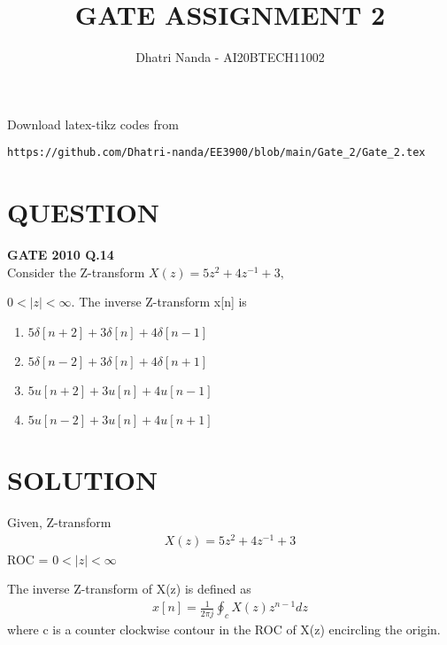 \documentclass[journal,12pt,twocolumn]{IEEEtran}
\begin{document}
\let\vec\mathbf
\renewcommand{\thefigure}{\theproblem}
\def\putbox#1#2#3{\makebox[0in][l]{\makebox[#1][l]{}\raisebox{\baselineskip}[0in][0in]{\raisebox{#2}[0in][0in]{#3}}}}
     \def\rightbox#1{\makebox[0in][r]{#1}}
     \def\centbox#1{\makebox[0in]{#1}}
     \def\topbox#1{\raisebox{-\baselineskip}[0in][0in]{#1}}
     \def\midbox#1{\raisebox{-0.5\baselineskip}[0in][0in]{#1}}
\vspace{3cm}
\title{\textbf{ GATE ASSIGNMENT 2}}
\author{Dhatri Nanda - AI20BTECH11002}
\maketitle
\newpage
\bigskip
\renewcommand{\thefigure}{\arabic{figure}}
\renewcommand{\thetable}{\arabic{table}}
Download latex-tikz codes from 
%
\begin{lstlisting}
https://github.com/Dhatri-nanda/EE3900/blob/main/Gate_2/Gate_2.tex
\end{lstlisting}
\section*{QUESTION}
\textbf{GATE 2010 Q.14}
\\
Consider the Z-transform $X(z) = 5z^2 + 4z^{-1} + 3,$

$ 0 < |z| < \infty$. The inverse Z-transform x[n] is

\begin{enumerate}[label={\Alph*)}]
\item $5\delta[n+2] + 3\delta[n] + 4\delta[n-1]$
\item $5\delta[n-2] + 3\delta[n] + 4\delta[n+1]$
\item $5u[n+2] + 3u[n] + 4u[n-1]$
\item $5u[n-2] + 3u[n] + 4u[n+1]$
\end{enumerate}

\section*{SOLUTION}
Given, Z-transform 
\begin{align}
    X(z) = 5z^2 + 4z^{-1} + 3 \label{eq 0}
\end{align}
ROC = $0<|z|<\infty$

The inverse Z-transform of X(z) is defined as 
\begin{align}
    x[n] = \frac{1}{2\pi j} \oint_{c} X(z)z^{n-1}dz
\end{align}
where c is a counter clockwise contour in the ROC of X(z) encircling the origin. 
\end{document}
